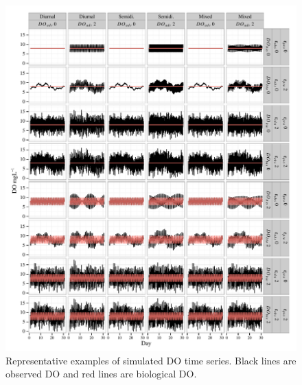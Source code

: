 \documentclass{article}\usepackage{graphicx, color}
\makeatletter
\def\maxwidth{ %
  \ifdim\Gin@nat@width>\linewidth
    \linewidth
  \else
    \Gin@nat@width
  \fi
}
\newenvironment{knitrout}{}{} %
\makeatother
\begin{document}
\begin{knitrout}
\color{fgcolor}\begin{figure}[!h]


{\centering \includegraphics[width=\maxwidth]{figure/sim_ex} 

}

\caption[Representative examples of simulated DO time series]{Representative examples of simulated DO time series.  Black lines are observed DO and red lines are biological DO.\label{fig:sim_ex}}
\end{figure}


\end{knitrout}



\clearpage
\end{document}
